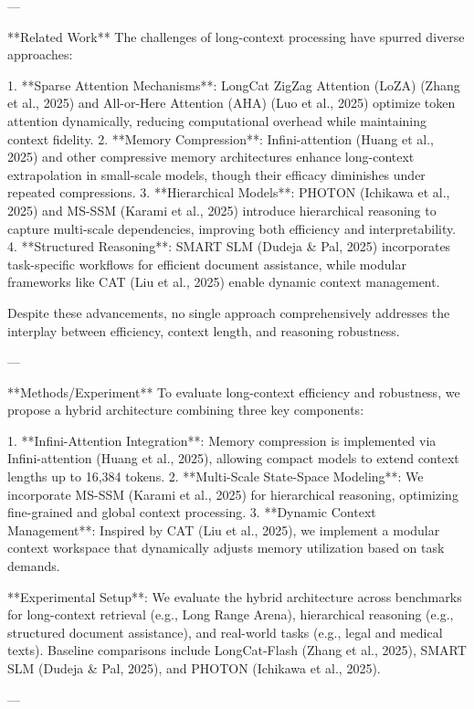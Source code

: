 ---

**Related Work**  
The challenges of long-context processing have spurred diverse approaches:  

1. **Sparse Attention Mechanisms**: LongCat ZigZag Attention (LoZA) (Zhang et al., 2025) and All-or-Here Attention (AHA) (Luo et al., 2025) optimize token attention dynamically, reducing computational overhead while maintaining context fidelity.  
2. **Memory Compression**: Infini-attention (Huang et al., 2025) and other compressive memory architectures enhance long-context extrapolation in small-scale models, though their efficacy diminishes under repeated compressions.  
3. **Hierarchical Models**: PHOTON (Ichikawa et al., 2025) and MS-SSM (Karami et al., 2025) introduce hierarchical reasoning to capture multi-scale dependencies, improving both efficiency and interpretability.  
4. **Structured Reasoning**: SMART SLM (Dudeja & Pal, 2025) incorporates task-specific workflows for efficient document assistance, while modular frameworks like CAT (Liu et al., 2025) enable dynamic context management.  

Despite these advancements, no single approach comprehensively addresses the interplay between efficiency, context length, and reasoning robustness.  

---

**Methods/Experiment**  
To evaluate long-context efficiency and robustness, we propose a hybrid architecture combining three key components:  

1. **Infini-Attention Integration**: Memory compression is implemented via Infini-attention (Huang et al., 2025), allowing compact models to extend context lengths up to 16,384 tokens.  
2. **Multi-Scale State-Space Modeling**: We incorporate MS-SSM (Karami et al., 2025) for hierarchical reasoning, optimizing fine-grained and global context processing.  
3. **Dynamic Context Management**: Inspired by CAT (Liu et al., 2025), we implement a modular context workspace that dynamically adjusts memory utilization based on task demands.  

**Experimental Setup**:  
We evaluate the hybrid architecture across benchmarks for long-context retrieval (e.g., Long Range Arena), hierarchical reasoning (e.g., structured document assistance), and real-world tasks (e.g., legal and medical texts). Baseline comparisons include LongCat-Flash (Zhang et al., 2025), SMART SLM (Dudeja & Pal, 2025), and PHOTON (Ichikawa et al., 2025).  

---

